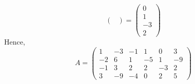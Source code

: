 \documentclass{exam}
\begin{document}
\begin{solution}
\[\begin{pmatrix}
      \end{pmatrix}
      = \begin{pmatrix}
        0 \\ 1 \\ -3 \\ 2
      \end{pmatrix}
    \]
    Hence, 
    \[
      \boxed{
        A = \begin{pmatrix}
          1 & -3 & -1 & 1 & 0 & 3 \\
          -2 & 6 & 1 & -5 & 1 & -9 \\
          -1 & 3 & 2 & 2 & -3 & 2 \\
          3 & -9 & -4 & 0 & 2 & 5
        \end{pmatrix}
      }
    \]
  \end{solution}
\end{document}
